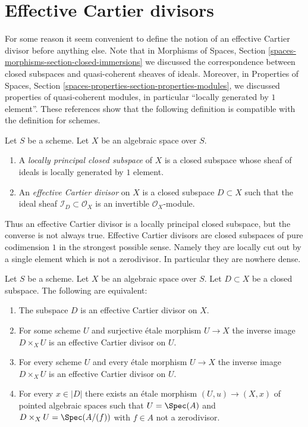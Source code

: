 \section{Effective Cartier divisors}
\label{section-effective-Cartier-divisors}

\noindent
For some reason it seem convenient to define the notion of an effective
Cartier divisor before anything else. Note that in
Morphisms of Spaces, Section \ref{spaces-morphisms-section-closed-immersions}
we discussed the correspondence between closed subspaces and quasi-coherent
sheaves of ideals. Moreover, in
Properties of Spaces, Section
\ref{spaces-properties-section-properties-modules}, we discussed properties
of quasi-coherent modules, in particular ``locally generated by $1$ element''.
These references show that the following definition is
compatible with the definition for schemes.

\begin{definition}
\label{definition-effective-Cartier-divisor}
Let $S$ be a scheme. Let $X$ be an algebraic space over $S$.
\begin{enumerate}
\item A {\it locally principal closed subspace} of $X$ is a closed subspace
whose sheaf of ideals is locally generated by $1$ element.
\item An {\it effective Cartier divisor} on $X$ is a closed subspace
$D \subset X$ such that the ideal sheaf $\mathcal{I}_D \subset \mathcal{O}_X$
is an invertible $\mathcal{O}_X$-module.
\end{enumerate}
\end{definition}

\noindent
Thus an effective Cartier divisor is a locally principal closed subspace,
but the converse is not always true. Effective Cartier divisors are closed
subspaces of pure codimension $1$ in the strongest possible sense. Namely
they are locally cut out by a single element which is not a zerodivisor.
In particular they are nowhere dense.

\begin{lemma}
\label{lemma-characterize-effective-Cartier-divisor}
Let $S$ be a scheme. Let $X$ be an algebraic space over $S$.
Let $D \subset X$ be a closed subspace.
The following are equivalent:
\begin{enumerate}
\item The subspace $D$ is an effective Cartier divisor on $X$.
\item For some scheme $U$ and surjective \'etale morphism $U \to X$
the inverse image $D \times_X U$ is an effective Cartier divisor on $U$.
\item For every scheme $U$ and every \'etale morphism $U \to X$
the inverse image $D \times_X U$ is an effective Cartier divisor on $U$.
\item For every $x \in |D|$ there exists an \'etale morphism
$(U, u) \to (X, x)$ of pointed algebraic spaces such that $U = \Spec(A)$
and $D \times_X U = \Spec(A/(f))$ with $f \in A$ not a zerodivisor.
\end{enumerate}
\end{lemma}

